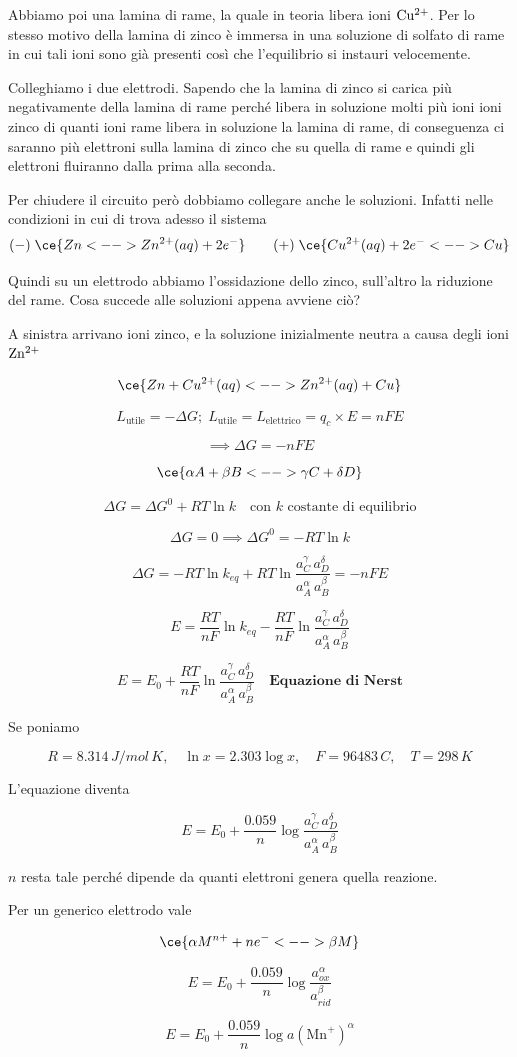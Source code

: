 Abbiamo poi una lamina di rame, la quale in teoria libera ioni $\rm Cu^{2+}$. Per lo stesso motivo della lamina di zinco è immersa in una soluzione di solfato di rame in cui tali ioni sono già presenti così che l'equilibrio si instauri velocemente.

Colleghiamo i due elettrodi. Sapendo che la lamina di zinco si carica più negativamente della lamina di rame perché libera in soluzione molti più ioni ioni zinco di quanti ioni rame libera in soluzione la lamina di rame, di conseguenza ci saranno più elettroni sulla lamina di zinco che su quella di rame e quindi gli elettroni fluiranno dalla prima alla seconda.

Per chiudere il circuito però dobbiamo collegare anche le soluzioni. Infatti nelle condizioni in cui di trova adesso
il sistema
$$(-) \; \ce{Zn <--> Zn^{2+}(aq) + 2e^-} \qquad (+) \; \ce{ Cu^{2+}(aq) + 2e^- <--> Cu}$$

Quindi su un elettrodo abbiamo l'ossidazione dello zinco, sull'altro la riduzione del rame. Cosa succede alle soluzioni appena avviene ciò?

A sinistra arrivano ioni zinco, e la soluzione inizialmente neutra a causa degli ioni $\rm Zn^{2+}$

$$\ce{Zn + Cu^{2+}(aq) <--> Zn^{2+}(aq) + Cu}$$

$$L_{\text{utile}}=- \Delta G; \; L_{\text{utile}}=L_{\text{elettrico}}=q_c \times E=nFE$$

$$\implies \Delta G = -nFE$$

$$\ce{\alpha A + \beta B <--> \gamma C + \delta D}$$

$$\Delta G = \Delta G^0 + RT\ln k \quad \text{con }k \text{ costante di equilibrio}$$

$$\Delta G=0 \implies \Delta G^0= -RT \ln k$$

$$\Delta G =  -RT \ln k_{eq} + RT \ln \frac{a_C^{\gamma} \, a_D^{\delta}}{a_A^{\alpha} \, a_B^{\beta}}=-nFE$$

$$E=\frac{RT}{nF}\ln k_{eq} - \frac{RT}{nF}\ln \frac{a_C^{\gamma} \, a_D^{\delta}}{a_A^{\alpha} \, a_B^{\beta}}$$

$$E= E_0 + \frac{RT}{nF}\ln \frac{a_C^{\gamma} \, a_D^{\delta}}{a_A^{\alpha} \, a_B^{\beta}} \quad \textbf{Equazione di Nerst}$$

Se poniamo

$$R=8.314 \, J/mol\,K, \quad \ln x = 2.303 \log x, \quad F=96483 \, C, \quad T=298 \,K$$

L'equazione diventa

$$E = E_0 + \frac{0.059}{n}\log \frac{a_C^{\gamma} \, a_D^{\delta}}{a_A^{\alpha} \, a_B^{\beta}}$$

$n$ resta tale perché dipende da quanti elettroni genera quella reazione.

\vspace{0.2cm}Per un generico elettrodo vale

$$\ce{\alpha M^{n+} + ne^- <--> \beta M}$$

$$E = E_0 + \frac{0.059}{n}\log \frac{a_{ox}^{\alpha}}{a_{rid}^{\beta}}$$

$$E = E_0 + \frac{0.059}{n}\log a(\text{Mn}^+)^{\alpha}$$